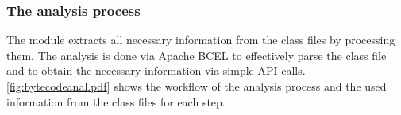 %  
% 
% 
% 


\subsubsection{The analysis process}
The module extracts all necessary information from the class files by processing
them. The analysis is done via Apache BCEL to effectively parse the class file
and to obtain the necessary information via simple API calls.
\autoref{fig:bytecodeanal.pdf} shows the workflow of the analysis process and the
used information from the class files for each step.

